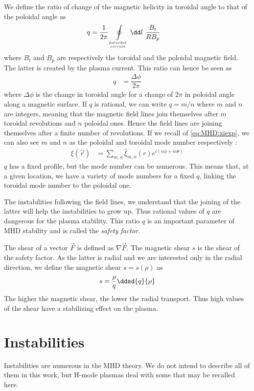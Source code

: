 We define the ratio of change of the magnetic helicity in toroidal angle to that of the poloidal angle as \cite{boyd-sanderson}
\begin{align}
	q & = \frac{1}{2 \pi} \oint\limits_{poloidal \atop circuit} \dd l\ \frac{B_t}{R B_p}   \label{eq:MHD:stab:q}
\end{align}
where $B_t$ and $B_p$ are respectively the toroidal and the poloidal magnetic field. The latter is created by the plasma current. This ratio can hence be seen as
\begin{align*}
	q & = \dfrac{\Delta \phi}{2 \pi}
\end{align*}
where $\Delta \phi$ is the change in toroidal angle for a change of $2 \pi$ in poloidal angle along a magnetic surface. If $q$ is rational, we can write $q = m / n$ where $m$ and $n$ are integers, meaning that the magnetic field lines join themselves after $m$ toroidal revolutions and $n$ poloidal ones. Hence the field lines are joining themselves after a finite number of revolutions. If we recall of \eqref{eq:MHD:xiexp}, we can also see $m$ and $n$ as the poloidal and toroidal mode number respectively \cite{gimblett2006}:
\begin{align*}
	\xi(\vec{r}) & = \sum_{m,n} \hat{\xi}_{m,n}(r) e^{ i ( n \phi + m \theta ) }
\end{align*}
$q$ has a fixed profile, but the mode number can be numerous. This means that, at a given location, we have a variety of mode numbers for a fixed $q$, linking the toroidal mode number to the poloidal one.

The instabilities following the field lines, we understand that the joining of the latter will help the instabilities to grow up. Thus rational values of $q$ are dangerous for the plasma stability. This ratio $q$ is an important parameter of MHD stability and is called the \emph{safety factor}.

The shear of a vector $\vec{F}$ is defined as $\nabla \vec{F}$. The magnetic shear $s$ is the shear of the safety factor. As the latter is radial and we are interested only in the radial direction, we define the magnetic shear $s = s(\rho)$ as
\begin{align*}
	s = \frac{\rho}{q} \ddsd{q}{\rho}
\end{align*}
The higher the magnetic shear, the lower the radial transport. Thus high values of the shear have a stabilizing effect on the plasma.
\section{Instabilities}\label{sec:MHD:instab}
Instabilities are numerous in the MHD theory. We do not intend to describe all of them in this work, but H-mode plasmas deal with some that may be recalled here.


